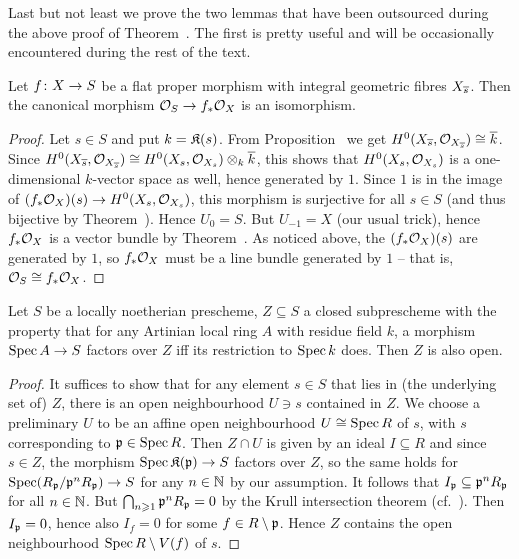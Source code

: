 \documentclass[a4paper,parskip=half,numbers=enddot, DIV=12]{scrreprt}
\renewcommand{\geq}{\geqslant}
\begin{document}
Last but not least we prove the two lemmas that have been outsourced during the above proof of Theorem~. The first is pretty useful and will be occasionally encountered during the rest of the text.
\begin{lem}
	Let $f\colon X\morphism S$ be a flat proper morphism with integral geometric fibres $X_{\overline{s}}$. Then the canonical morphism $\Oo_S\morphism f_*\Oo_X$ is an isomorphism.
\end{lem}
\begin{proof}
	Let $s\in S$ and put $k=\mathfrak{K}(s)$. From Proposition~ we get $H^0(X_{\overline{s}},\mathcal{O}_{X_{\overline{s}}})\cong \overline k$. Since $H^0(X_{\overline{s}},\mathcal{O}_{X_{\overline{s}}})\cong H^0(X_s,\mathcal{O}_{X_s})\otimes_k\overline{k}$, this shows that $H^0(X_s,\mathcal{O}_{X_s})$ is a one-dimensional $k$-vector space as well, hence generated by $1$. Since $1$ is in the image of $(f_*\Oo_X)(s)\morphism H^0(X_s,\Oo_{X_s})$, this morphism is surjective for all $s\in S$ (and thus bijective by Theorem~). Hence $U_0=S$. But $U_{-1}=X$ (our usual trick), hence $f_*\mathcal{O}_X$ is a vector bundle by Theorem~. As noticed above, the $(f_*\mathcal{O}_X)(s)$ are generated by $1$, so $f_*\mathcal{O}_X$ must be a line bundle generated by $1$ -- that is, $\mathcal{O}_S\cong f_*\mathcal{O}_X$.
\end{proof}
\begin{lem}
	Let $S$ be a locally noetherian prescheme, $Z\subseteq S$ a closed subprescheme with the property that for any Artinian local ring $A$ with residue field $k$, a morphism $\Spec A\morphism S$ factors over $Z$ iff its restriction to $\operatorname{Spec} k$ does. Then $Z$ is also open.
\end{lem}
\begin{proof}
	It suffices to show that for any element $s\in S$ that lies in (the underlying set of) $Z$, there is an open neighbourhood $U\ni s$ contained in $Z$. We choose a preliminary $U$ to be an affine open neighbourhood $U\cong \operatorname{Spec} R$ of $s$, with $s$ corresponding to $\mathfrak{p}\in\operatorname{Spec} R$. Then $Z\cap U$ is given by an ideal $I\subseteq R$ and since $s\in Z$, the morphism $\Spec\KK(\pp)\morphism S$ factors over $Z$, so the same holds for $\Spec(R_\pp/\pp^nR_\pp)\morphism S$ for any $n\in \mathbb{N}$ by our assumption. It follows that $I_{\mathfrak{p}}\subseteq \mathfrak{p}^nR_{\mathfrak{p}}$ for all $n\in \mathbb{N}$. But $\bigcap_{n\geq 1}\pp^nR_\pp=0$ by the Krull intersection theorem (cf.\ \cite[Corollary~3.4.8]{alg2}). Then $I_{\mathfrak{p}}=0$, hence also $I_f=0$ for some $f\in R\setminus \mathfrak{p}$. Hence $Z$ contains the open neighbourhood $\operatorname{Spec} R\setminus V(f)$ of $s$.
\end{proof}
\end{document}
